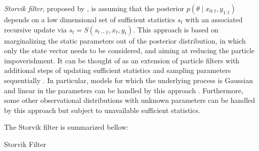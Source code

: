 \textit{Storvik filter}, proposed by \cite{storvik2002particle}, is assuming that the posterior $p(\theta\mid x_{0:t},y_{1:t})$ depends on a low dimensional set of sufficient statistics $s_t$ with an associated recursive update via $s_t=S(s_{t-1},x_t,y_t)$. This approach is based on marginalizing the static parameters out of the posterior distribution, in which only the state vector needs to be considered, and aiming at reducing the particle impoverishment. It can be thought of as an extension of particle filters with additional steps of updating sufficient statistics and sampling parameters sequentially \citep{lopes2011particle}. In particular, models for which the underlying process is Gaussian and linear in the parameters can be handled by this approach \citep{storvik2002particle}. Furthermore, some other observational distributions with unknown parameters can be handled by this approach but subject to unavailable sufficient statistics. 

The Storvik filter is summarized bellow:
\begin{algorithm}[h]
\SetAlgoLined 
\caption{Storvik Filter}\label{algorithmStFilter}
\end{algorithm}


